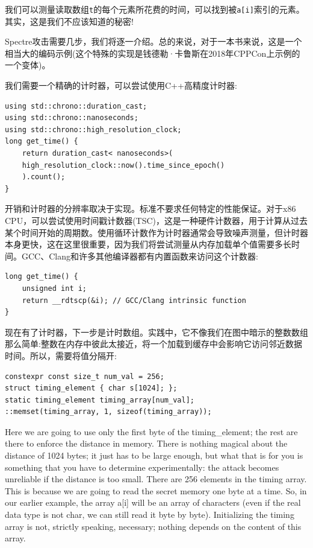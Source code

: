 我们可以测量读取数组\texttt{t}的每个元素所花费的时间，可以找到被\texttt{a[i]}索引的元素。其实，这是我们不应该知道的秘密!


Spectre攻击需要几步，我们将逐一介绍。总的来说，对于一本书来说，这是一个相当大的编码示例(这个特殊的实现是钱德勒·卡鲁斯在2018年CPPCon上示例的一个变体)。

我们需要一个精确的计时器，可以尝试使用C++高精度计时器:

\begin{lstlisting}[style=styleCXX]
using std::chrono::duration_cast;
using std::chrono::nanoseconds;
using std::chrono::high_resolution_clock;
long get_time() {
	return duration_cast< nanoseconds>(
	high_resolution_clock::now().time_since_epoch()
	).count();
}
\end{lstlisting}

开销和计时器的分辨率取决于实现。标准不要求任何特定的性能保证。对于x86 CPU，可以尝试使用时间戳计数器(TSC)，这是一种硬件计数器，用于计算从过去某个时间开始的周期数。使用循环计数作为计时器通常会导致噪声测量，但计时器本身更快，这在这里很重要，因为我们将尝试测量从内存加载单个值需要多长时间。GCC、Clang和许多其他编译器都有内置函数来访问这个计数器:

\begin{lstlisting}[style=styleCXX]
long get_time() {
	unsigned int i;
	return __rdtscp(&i); // GCC/Clang intrinsic function
}
\end{lstlisting}

现在有了计时器，下一步是计时数组。实践中，它不像我们在图中暗示的整数数组那么简单:整数在内存中彼此太接近，将一个加载到缓存中会影响它访问邻近数据时间。所以，需要将值分隔开:

\begin{lstlisting}[style=styleCXX]
constexpr const size_t num_val = 256;
struct timing_element { char s[1024]; };
static timing_element timing_array[num_val];
::memset(timing_array, 1, sizeof(timing_array));
\end{lstlisting}

Here we are going to use only the first byte of the timing\_element; the rest are there to enforce the distance in memory. There is nothing magical about the distance of 1024 bytes; it just has to be large enough, but what that is for you is something that you have to determine experimentally: the attack becomes unreliable if the distance is too small. There are 256 elements in the timing array. This is because we are going to read the secret memory one byte at a time. So, in our earlier example, the array a[i] will be an array of characters (even if the real data type is not char, we can still read it byte by byte). Initializing the timing array is not, strictly speaking, necessary; nothing depends on the content of this array.

